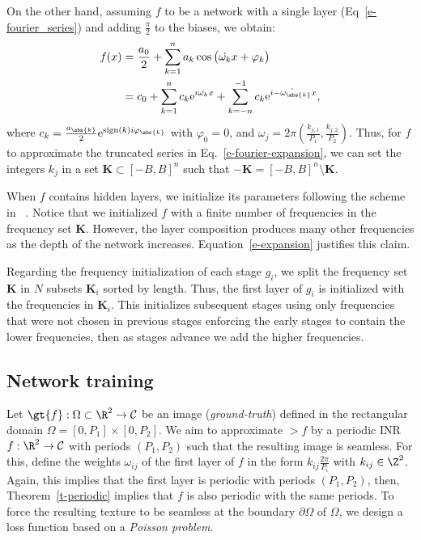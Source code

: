 On the other hand, assuming $f$ to be a network with a single layer (Eq~\eqref{e-fourier_series}) and adding $\frac{\pi}{2}$ to the biases, we obtain:
\begin{align}\small
    f(x) &=  \frac{a_0}{2} + \sum_{k=1}^{n} a_k  \cos\big(\dot{\omega_k}{ x}+ \varphi_k\big)\\
    &=  c_0 + \sum_{k=1}^{n} c_k  \text{e}^{i\dot{\omega_{{k}}}{ x}}+ \sum_{k=-n}^{-1} c_k  \text{e}^{i\dot{-\omega_{\abs{k}}}{ x}},\label{e-mlp2complex}
\end{align}
where $c_k=\frac{a_{\abs{k}}}{2}\text{e}^{\text{sign}(k)i\varphi_{\abs{k}}}$ with $\varphi_0=0$, and $\omega_{j}=2\pi\left(\frac{k_{j,1}}{P_1}, \frac{k_{j,2}}{P_2}\right)$. 
%
Thus, for $f$ to approximate the truncated series in Eq.~\eqref{e-fourier-expansion}, we can set
the integers $k_{j}$ in a set $\textbf{K}\subset [-B,B]^n$ such that $-\textbf{K} = [-B,B]^n\setminus \textbf{K}$.

When $f$ contains hidden layers, we initialize its parameters following the scheme in ~\cite{sitzmann2019siren}. 
Notice that we initialized $f$ with a finite number of frequencies in the frequency set $\textbf{K}$. However, 
the layer composition produces many other frequencies as the depth of the network increases.
Equation~\ref{e-expansion} justifies this claim.


Regarding the frequency initialization of each stage $g_i$, we split the frequency set $\textbf{K}$ in $N$ subsets $\textbf{K}_i$ sorted by length.
Thus, the first layer of $g_i$ is initialized with the frequencies in $\textbf{K}_i$.
This initializes subsequent stages using only frequencies that were not chosen in previous stages enforcing the early stages to contain the lower frequencies, then as stages advance we add the higher frequencies.




\subsection{Network training}
\label{s-training}
Let $\gt{f}:\Omega\subset\R^2\to \mathcal{C}$ be an image (\textit{ground-truth}) defined in the rectangular domain $\Omega=[0,P_1]\times[0,P_2]$. 
We aim to approximate $\gt{f}$ by a periodic INR ${f}:\R^2\to \mathcal{C}$ with periods $(P_1, P_2)$ such that the resulting image is seamless. 
For this, define the weights $\omega_{ij}$ of the first layer of $f$ in the form $k_{ij}\frac{2\pi}{P_i}$ with $k_{ij}\in \Z^2$.
Again, this implies that the first layer is periodic with periods $(P_1,P_2)$, then, Theorem~\ref{t-periodic} implies that $f$ is also periodic with the same periods. 
To force the resulting texture to be seamless at the boundary $\partial \Omega$ of $\Omega$, we design a loss function based on a \textit{Poisson problem}.


